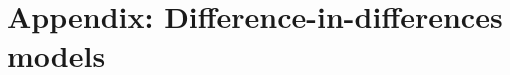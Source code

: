 \documentclass[../main.tex]{subfiles}
\begin{document}
\section{Appendix: Difference-in-differences models}
\label{sec:appendixc}
\end{document}
